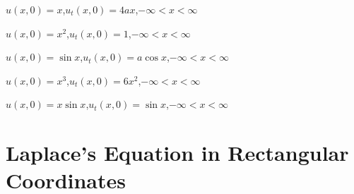 \begin{exerciselist}


\item\label{exer:12.2.64}$u(x,0)=x$,\quad $u_t(x,0)=4ax$,\quad $-\infty<x<\infty$

\item\label{exer:12.2.65}$u(x,0)=x^2$,\quad $u_t(x,0)=1$,\quad $-\infty<x<\infty$

\item\label{exer:12.2.66}$u(x,0)=\sin x$,\quad $u_t(x,0)=a\cos x$,\quad $-\infty<x<\infty$

\item\label{exer:12.2.67}$u(x,0)=x^3$,\quad $u_t(x,0)=6x^2$,\quad $-\infty<x<\infty$


\item\label{exer:12.2.68}$u(x,0)=x\sin x$,\quad $u_t(x,0)=\sin x$,\quad $-\infty<x<\infty$
\end{exerciselist}


\section{Laplace's Equation in Rectangular Coordinates}\label{sec:laplace_rect}

